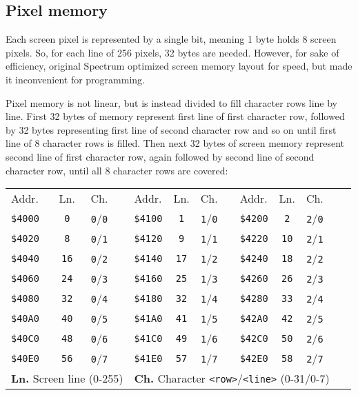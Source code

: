 \documentclass[12pt,twoside,openright,a4paper]{book}
\begin{document}
\subsection{Pixel memory}

Each screen pixel is represented by a single bit, meaning 1 byte holds 8 screen pixels. So, for each line of 256 pixels, 32 bytes are needed. However, for sake of efficiency, original Spectrum optimized screen memory layout for speed, but made it inconvenient for programming.

Pixel memory is not linear, but is instead divided to fill character rows line by line. First 32 bytes of memory represent first line of first character row, followed by 32 bytes representing first line of second character row and so on until first line of 8 character rows is filled. Then next 32 bytes of screen memory represent second line of first character row, again followed by second line of second character row, until all 8 character rows are covered:

{
	\newcommand{\PixelTitle}{Addr. & Ln. & Ch.}
	\newcommand{\PixelData}[4]{{\tt \$#1} & {\tt #2} & {\tt #3}/{\tt #4}}

	\begin{tabularx}{0.9\linewidth}{lccXlccXlcccX}
		\addtolength{\tabcolsep}{-2pt}
		\PixelTitle & & \PixelTitle & & \PixelTitle & & \\
		\PixelData{4000}{0}{0}{0} & & \PixelData{4100}{1}{1}{0} & & \PixelData{4200}{2}{2}{0} & & \multirow{8}{*}{\ddd} \\
		\PixelData{4020}{8}{0}{1} & & \PixelData{4120}{9}{1}{1} & & \PixelData{4220}{10}{2}{1} & & \\
		\PixelData{4040}{16}{0}{2} & & \PixelData{4140}{17}{1}{2} & & \PixelData{4240}{18}{2}{2} & & \\
		\PixelData{4060}{24}{0}{3} & & \PixelData{4160}{25}{1}{3} & & \PixelData{4260}{26}{2}{3} & & \\
		\PixelData{4080}{32}{0}{4} & & \PixelData{4180}{32}{1}{4} & & \PixelData{4280}{33}{2}{4} & & \\
		\PixelData{40A0}{40}{0}{5} & & \PixelData{41A0}{41}{1}{5} & & \PixelData{42A0}{42}{2}{5} & & \\
		\PixelData{40C0}{48}{0}{6} & & \PixelData{41C0}{49}{1}{6} & & \PixelData{42C0}{50}{2}{6} & & \\
		\PixelData{40E0}{56}{0}{7} & & \PixelData{41E0}{57}{1}{7} & & \PixelData{42E0}{58}{2}{7} & & \\[1ex]
		\multicolumn{4}{l}{\textbf{Ln.} Screen line (0-255)} & \multicolumn{9}{l}{\textbf{Ch.} Character {\tt <row>}/{\tt <line>} (0-31/0-7)} \\
	\end{tabularx}
}
\end{document}
